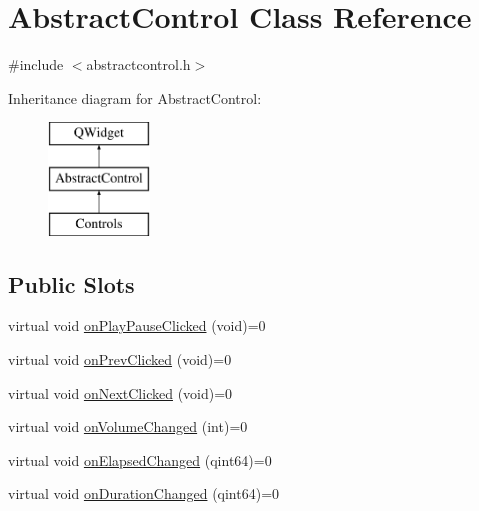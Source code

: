 \hypertarget{class_abstract_control}{\section{Abstract\-Control Class Reference}
\label{class_abstract_control}
}


{\ttfamily \#include $<$abstractcontrol.\-h$>$}

Inheritance diagram for Abstract\-Control\-:\begin{figure}[H]
\begin{center}
\leavevmode
\includegraphics[height=3.000000cm]{class_abstract_control}
\end{center}
\end{figure}
\subsection*{Public Slots}
\begin{DoxyCompactItemize}
\item 
virtual void \hyperlink{class_abstract_control_a99d0d68402b7546c624e6bb7696ee95d}{on\-Play\-Pause\-Clicked} (void)=0
\item 
virtual void \hyperlink{class_abstract_control_abdb7309086319e82a30dfbccea290d60}{on\-Prev\-Clicked} (void)=0
\item 
virtual void \hyperlink{class_abstract_control_a45d6fe6a83a66ae6f69e3b631fbdd547}{on\-Next\-Clicked} (void)=0
\item 
virtual void \hyperlink{class_abstract_control_a0d76bc546bc9bb2be13573814f43ede2}{on\-Volume\-Changed} (int)=0
\item 
virtual void \hyperlink{class_abstract_control_a4aa7cd659eddd599b03df5d905cc1806}{on\-Elapsed\-Changed} (qint64)=0
\item 
virtual void \hyperlink{class_abstract_control_a536755040aecaba6aff81a1704801ef6}{on\-Duration\-Changed} (qint64)=0
\end{DoxyCompactItemize}
